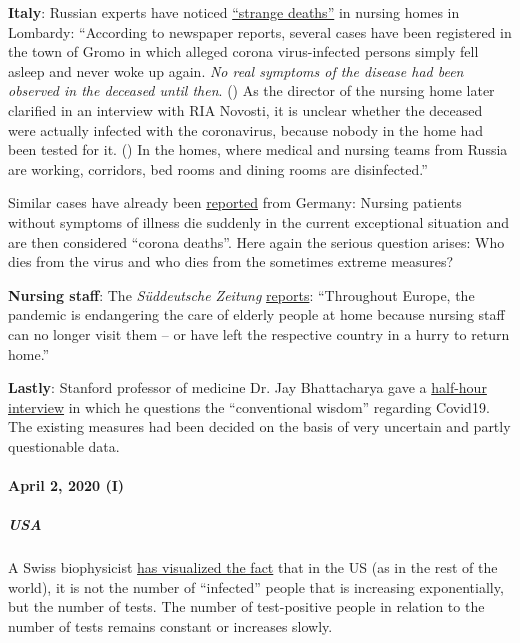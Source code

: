 \textbf{Italy}: Russian experts have noticed
\href{https://de.sputniknews.com/panorama/20200402326767475-fachpersonal-todesfaelle-lombardei-zeitung/}{``strange
deaths''} in nursing homes in Lombardy: ``According to newspaper
reports, several cases have been registered in the town of Gromo in
which alleged corona virus-infected persons simply fell asleep and never
woke up again. \emph{No real symptoms of the disease had been observed
in the deceased until then}. () As the director of the nursing home
later clarified in an interview with RIA Novosti, it is unclear whether
the deceased were actually infected with the coronavirus, because nobody
in the home had been tested for it. () In the homes, where medical and
nursing teams from Russia are working, corridors, bed rooms and dining
rooms are disinfected.''

Similar cases have already been
\href{https://web.archive.org/web/20200330082928/https://www.sueddeutsche.de/panorama/coronavirus-news-deutschland-wolfsburg-laschet-1.4828033}{reported}
from Germany: Nursing patients without symptoms of illness die suddenly
in the current exceptional situation and are then considered ``corona
deaths''. Here again the serious question arises: Who dies from the
virus and who dies from the sometimes extreme measures?

\textbf{Nursing staff}: The \emph{Süddeutsche Zeitung}
\href{https://www.sueddeutsche.de/politik/coronavirus-pflegekraefte-ausland-1.4866124}{reports}:
``Throughout Europe, the pandemic is endangering the care of elderly
people at home because nursing staff can no longer visit them -- or have
left the respective country in a hurry to return home.''

\textbf{Lastly}: Stanford professor of medicine Dr. Jay Bhattacharya
gave a \href{https://www.youtube.com/watch?v=-UO3Wd5urg0}{half-hour
interview} in which he questions the ``conventional wisdom'' regarding
Covid19. The existing measures had been decided on the basis of very
uncertain and partly questionable data.

\hypertarget{april-2-2020-i}{%
\paragraph{April 2, 2020 (I)}\label{april-2-2020-i}}

\hypertarget{usa}{%
\subparagraph{\texorpdfstring{\textbf{USA}}{USA}}\label{usa}}

A Swiss biophysicist
\href{https://swprs.org/rate-of-positive-covid19-tests/}{has visualized
the fact} that in the US (as in the rest of the world), it is not the
number of ``infected'' people that is increasing exponentially, but the
number of tests. The number of test-positive people in relation to the
number of tests remains constant or increases slowly.

